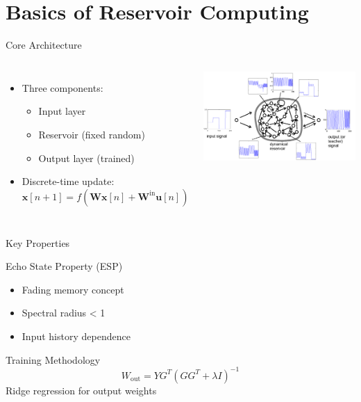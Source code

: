 \documentclass{beamer}
\begin{document}
\section{Basics of Reservoir Computing}
\begin{frame}{Core Architecture}
  \begin{columns}
    \begin{itemize}
      \item Three components:
      \begin{itemize}
        \item Input layer
        \item Reservoir (fixed random)
        \item Output layer (trained)
      \end{itemize}
      \item Discrete-time update:
      \[
      \mathbf{x}[n+1] = f(\mathbf{W}\mathbf{x}[n] + \mathbf{W}^{\text{in}}\mathbf{u}[n])
      \]
    \end{itemize}
    \includegraphics[width=\textwidth]{figures/ESN_diag_FreqGenSchema.png}
  \end{columns}
\end{frame}

\begin{frame}{Key Properties}
  \begin{block}{Echo State Property (ESP)}
    \begin{itemize}
      \item Fading memory concept
      \item Spectral radius < 1
      \item Input history dependence
    \end{itemize}
  \end{block}
  
  \begin{block}{Training Methodology}
    \[
    W_{\text{out}} = YG^T(GG^T + \lambda I)^{-1}
    \]
    Ridge regression for output weights
  \end{block}
\end{frame}
\end{document}
